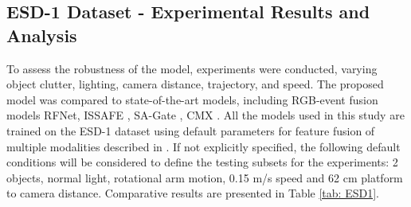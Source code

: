 \documentclass[lettersize,journal]{IEEEtran}
\begin{document}
\subsection{\textbf{ESD-1 Dataset - Experimental Results and Analysis}}
\label{section:Results ESD-1 Dataset}


To assess the robustness of the model, experiments were conducted, varying object clutter, lighting, camera distance, trajectory, and speed. The proposed model was compared to state-of-the-art models, including RGB-event fusion models RFNet\cite{Sun2020Real-TimeDetection}, ISSAFE \cite{Zhang2020ISSAFE:Data}, SA-Gate \cite{Xiaokang2020Bi-directionalSegmentation}, CMX \cite{Liu2022CMX:Transformers}. All the models used in this study are trained on the ESD-1 dataset \cite{Huang2023AEnvironment} using default parameters for feature fusion of multiple modalities described in \cite{Liu2022CMX:Transformers}. If not explicitly specified, the following default conditions will be considered to define the testing subsets for the experiments: 2 objects, normal light, rotational arm motion, 0.15 m/s speed and 62 cm platform to camera distance. Comparative results are presented in Table \ref{tab: ESD1}.
\end{document}
